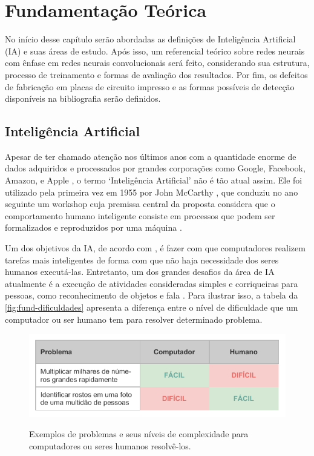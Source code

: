 \chapter{Fundamentação Teórica} \label{cap:fund}

No início desse capítulo serão abordadas  as definições de Inteligência Artificial (IA) e suas áreas de estudo. Após isso, um referencial teórico sobre redes neurais com ênfase em redes neurais convolucionais será feito, considerando sua estrutura, processo de treinamento e formas de avaliação dos resultados. Por fim, os defeitos de fabricação em placas de circuito impresso e as formas possíveis de detecção disponíveis na bibliografia serão definidos.

\section{Inteligência Artificial} \label{cap:fund-ia}

Apesar de ter chamado atenção nos últimos anos com a quantidade enorme de dados adquiridos e processados por grandes corporações como Google, Facebook, Amazon, e Apple \cite{ref:Lawless-Mittu-Sofge}, o termo `Inteligência Artificial' não é tão atual assim. Ele foi utilizado pela primeira vez em 1955 por John McCarthy \cite{ref:Cohen}, que conduziu no ano seguinte um workshop cuja premissa central da proposta considera que o comportamento humano inteligente consiste em processos que podem ser formalizados e reproduzidos por uma máquina \cite{ref:Harvard-AI}. %

Um dos objetivos da IA, de acordo com , é fazer com que computadores realizem tarefas mais inteligentes de forma com que não haja necessidade dos seres humanos executá-las. Entretanto, um dos grandes desafios da área de IA atualmente é a execução de atividades consideradas simples e corriqueiras para pessoas, como reconhecimento de objetos e fala \cite{ref:Goodfellow-Bengio-Courville}. Para ilustrar isso, a tabela da \autoref{fig:fund-dificuldades} apresenta a diferença entre o nível de dificuldade que um computador ou ser humano tem para resolver determinado problema.

\begin{figure}[h!] %
  \centering
  \caption{Exemplos de problemas e seus níveis de complexidade para computadores ou seres humanos resolvê-los.}
  \includegraphics[scale=1.1]{img/img-fundamentacao-dificuldades.pdf}
  \label{fig:fund-dificuldades}
\end{figure}

